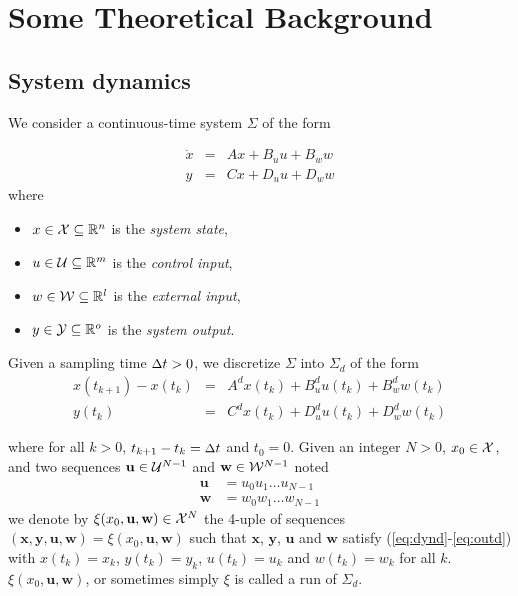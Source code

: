 \documentclass[hyperref, xcolor=dvipsnames, 10pt]{article} %
\def \x {\mathbf{x}}
\def \u {\mathbf{u}}
\def \w {\mathbf{w}}
\def \y {\mathbf{y}}
\def\dt{ \text{\small $\Delta$}t}
\def\X {{\cal X}}
\def\U {{\cal U}}
\def\W {{\cal W}}
\def\Y {{\cal Y}}
\def\Reals {\mathbb{R}}
\begin{document}
\section{Some Theoretical Background} 

\subsection{System dynamics}
We consider a continuous-time system $\Sigma$ of the form 

\begin{eqnarray}
\dot{x} &= &A x + B_u u + B_w w \\ 
 y &=& C x + D_u u + D_w w
\end{eqnarray}
where 
\begin{itemize}
\item $x \in {\cal X} \subseteq \Reals^{n}$ is the \emph{system state},
\item $u \in \U \subseteq \Reals^{m}$ is the \emph{control input},
\item $w \in \W \subseteq \Reals^{l}$ is the \emph{external input}, 
\item $y \in \Y \subseteq \Reals^{o}$ is the \emph{system output}.
\end{itemize}

Given a sampling time $\dt>0$, we discretize $\Sigma$ into 
$\Sigma_d$ of the form
\begin{eqnarray}
x(t_{k+1}) - x(t_k) &= &A^d x(t_k) + B^d_u u(t_k) + B^d_w w(t_k)  \label{eq:dynd} \\ 
 y(t_k) &=& C^d x(t_k) + D^d_u u(t_k) + D^d_w w(t_k)  \label{eq:outd}
\end{eqnarray}

where for all $k>0$, $t_{k+1}-t_k = \dt$ and $t_0=0$. Given an integer $N>0$, $x_0\in\X$, and two sequences 
$\u \in \U^{N-1}$ and $\w \in \W^{N-1}$ noted
\begin{eqnarray*}
\u&= u_0u_1\hdots u_{N-1}\\
\w&= w_0w_1\hdots w_{N-1}
\end{eqnarray*}
we denote by $\xi(x_0, \u, \w) \in \X^N$ the 4-uple of sequences
$(\x,\y,\u,\w) = \xi(x_0, \u, \w)$ such that $\x$, $\y$, $\u$ and $\w$ satisfy (\ref{eq:dynd}-\ref{eq:outd}) with
$x(t_k)=x_k$, $y(t_k)=y_k$, $u(t_k)=u_k$ and $w(t_k)=w_k$ for all $k$. $\xi(x_0, \u, \w)$, or
sometimes simply $\xi$ is called a run of $\Sigma_d$.

\def\Dxi{\X\times\Y\times\U\times\W}
\end{document}
